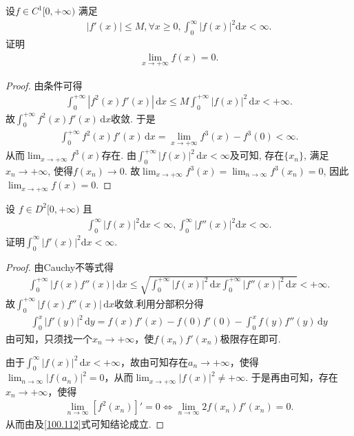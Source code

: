 \documentclass[../../main.tex]{subfiles}
\begin{document}
\begin{example}
设$f \in C^1[0, +\infty)$ 满足
\begin{align*}
|f'(x)| \leqslant M, \forall x \geqslant 0, \int_0^{\infty} |f(x)|^2 \mathrm{d}x < \infty.
\end{align*}
证明
\begin{align*}
\lim_{x \to +\infty} f(x) = 0.
\end{align*}
\end{example}
\begin{proof}
由条件可得
\begin{align*}
\int_0^{+\infty} \left| f^2(x) f'(x) \right| \, \mathrm{d}x \leqslant M \int_0^{+\infty} \left| f(x) \right|^2 \, \mathrm{d}x < +\infty.
\end{align*}
故$\int_0^{+\infty} f^2(x) f'(x) \, \mathrm{d}x$收敛. 于是
\begin{align*}
\int_0^{+\infty} f^2(x) f'(x) \, \mathrm{d}x = \lim_{x \to +\infty} f^3(x) - f^3(0) < \infty.
\end{align*}
从而$\lim_{x \to +\infty} f^3(x)$存在. 由$\int_0^{+\infty} \left| f(x) \right|^2 \, \mathrm{d}x < \infty$及可知, 存在$\{x_n\}$, 满足$x_n \to +\infty$, 使得$f(x_n) \to 0$.
故$\lim_{x \to +\infty} f^3(x) = \lim_{n \to \infty} f^3(x_n) = 0$, 因此$\lim_{x \to +\infty} f(x) = 0$.

\end{proof}

\begin{example}
设 $f \in D^2[0, +\infty)$ 且
\begin{align*}
\int_0^{\infty} |f(x)|^2 \mathrm{d}x < \infty, \int_0^{\infty} |f''(x)|^2 \mathrm{d}x < \infty.
\end{align*}
证明$\int_0^{\infty} |f'(x)|^2 \mathrm{d}x < \infty$.
\end{example}
\begin{proof}
由Cauchy不等式得
\begin{align*}
\int_0^{+\infty}|f(x)f''(x)|\,\mathrm{d}x\leqslant\sqrt{\int_0^{+\infty}|f(x)|^2\,\mathrm{d}x\int_0^{+\infty}|f''(x)|^2\,\mathrm{d}x}<+\infty.
\end{align*}
故$\int_0^{+\infty}|f(x)f''(x)|\,\mathrm{d}x$收敛.利用分部积分得
\begin{align}\label{100.112}
\int_0^x|f'(y)|^2\,\mathrm{d}y=f(x)f'(x)-f(0)f'(0)-\int_0^x f(y)f''(y)\,\mathrm{d}y
\end{align}
由可知，只须找一个$x_n\rightarrow+\infty$，使$f(x_n)f'(x_n)$极限存在即可.

由于$\int_0^{\infty}|f(x)|^2\,\mathrm{d}x<+\infty$，故由可知存在$a_n\rightarrow+\infty$，使得$\lim_{n\rightarrow\infty}|f(a_n)|^2=0$，从而$\lim_{x\rightarrow+\infty}|f(x)|^2\ne+\infty$.
于是再由可知，存在$x_n\rightarrow+\infty$，使得
\begin{align*}
\lim_{n\rightarrow\infty}[f^2(x_n)]'=0\Longleftrightarrow\lim_{n\rightarrow\infty}2f(x_n)f'(x_n)=0.
\end{align*}
从而由及\eqref{100.112}式可知结论成立.

\end{proof}
\end{document}
